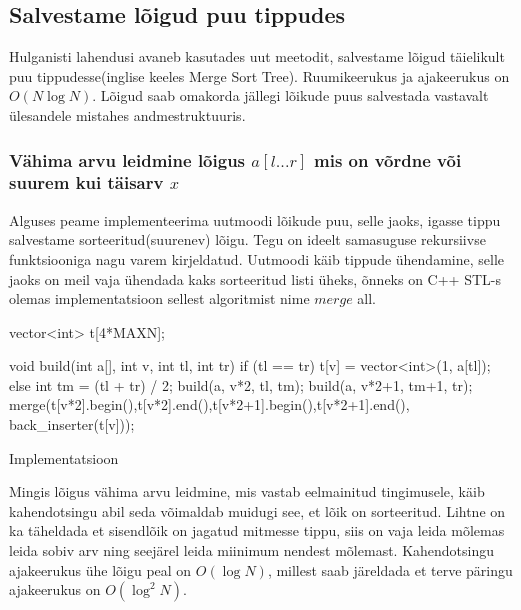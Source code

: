 \documentclass{trkut}
\begin{document}
\subsection{Salvestame lõigud puu tippudes}

Hulganisti lahendusi avaneb kasutades uut meetodit, salvestame lõigud täielikult puu tippudesse(inglise keeles Merge Sort Tree). Ruumikeerukus ja ajakeerukus on $O(N\log N)$. Lõigud saab omakorda jällegi lõikude puus salvestada vastavalt ülesandele mistahes andmestruktuuris. \parencite{EMaxx}

\subsubsection{Vähima arvu leidmine lõigus $a[l...r]$ mis on võrdne või suurem kui täisarv $x$}
Alguses peame implementeerima uutmoodi lõikude puu, selle jaoks, igasse tippu salvestame sorteeritud(suurenev) lõigu. Tegu on ideelt samasuguse rekursiivse funktsiooniga nagu varem kirjeldatud. 
Uutmoodi käib tippude ühendamine, selle jaoks on meil vaja ühendada kaks sorteeritud listi üheks, õnneks on C++ STL-s olemas implementatsioon sellest algoritmist nime $merge$ all. \parencite{EMaxx}

\begin{cclol}
vector<int> t[4*MAXN];

void build(int a[], int v, int tl, int tr) {
if (tl == tr) {
    t[v] = vector<int>(1, a[tl]);
} else { 
    int tm = (tl + tr) / 2;
    build(a, v*2, tl, tm);
    build(a, v*2+1, tm+1, tr);
    merge(t[v*2].begin(),t[v*2].end(),t[v*2+1].begin(),t[v*2+1].end(),
             back_inserter(t[v]));
}
}
\end{cclol}
 \begin{kk}[H]%
    \caption{Implementatsioon}%
    \label{EMaxx}%
    \end{kk}
Mingis lõigus vähima arvu leidmine, mis vastab eelmainitud tingimusele, käib kahendotsingu abil seda võimaldab muidugi see, et lõik on sorteeritud.
Lihtne on ka täheldada et sisendlõik on jagatud mitmesse tippu, siis on vaja leida mõlemas leida sobiv arv ning seejärel leida miinimum nendest mõlemast.
Kahendotsingu ajakeerukus ühe lõigu peal on $O(\log N)$, millest saab järeldada et terve päringu ajakeerukus on $O(\log^2 N)$. \parencite{EMaxx}
\end{document}
